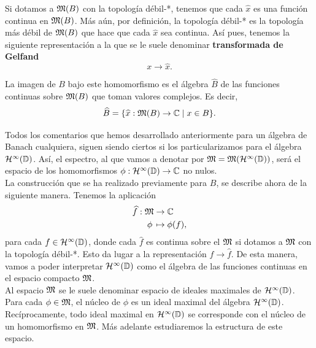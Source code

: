 Si dotamos a $\mathfrak{M}(B)$ con la topología débil-*, tenemos que cada $\widehat x$ es una función continua en $\mathfrak{M}(B)$. Más aún, por definición, la topología débil-* es la topología más débil de $\mathfrak{M}(B)$ que hace que cada $\widehat x$ sea continua. Así pues, tenemos la siguiente representación a la que se le suele denominar \textbf{transformada de Gelfand}
\begin{equation*}
    x \to \widehat x.
\end{equation*}

La imagen de $B$ bajo este homomorfismo es el álgebra $\widehat B$ de las funciones continuas sobre $\mathfrak{M}(B)$ que toman valores complejos. Es decir,
\begin{equation*}
    \widehat B = \{\widehat x: \mathfrak{M}(B) \to  \mathbb{C} \mid x \in B\}.
\end{equation*}

\medskip

Todos los comentarios que hemos desarrollado anteriormente para un álgebra de Banach cualquiera, siguen siendo ciertos si los particularizamos para el álgebra $\mathcal{H}^{\infty}(\mathbb{D})$. Así, el espectro, al que vamos a denotar por $\mathfrak{M} = \mathfrak{M} (\mathcal{H}^{\infty}(\mathbb{D}))$, será el espacio de los homomorfismos $\phi: \mathcal{H}^{\infty}(\mathbb{D}) \to \mathbb{C}$ no nulos. \\

La construcción que se ha realizado previamente para $B$, se describe ahora de la siguiente manera. Tenemos la aplicación
\begin{equation*}
    \begin{split}
        \widehat f:  \mathfrak{M} & \to  \mathbb{C} \\
                    \phi \, & \mapsto  \phi (f),
    \end{split}
\end{equation*}
para cada $f \in \mathcal{H}^{\infty}(\mathbb{D})$, donde cada $\widehat f$ es continua sobre el $\mathfrak{M}$ si dotamos a $\mathfrak{M}$ con la topología débil-*. Esto da lugar a la representación $f \to \widehat f$. De esta manera, vamos a poder interpretar $\mathcal{H}^{\infty}(\mathbb{D})$ como el álgebra de las funciones continuas en el espacio compacto $\mathfrak{M}$. \\

Al espacio $\mathfrak{M}$ se le suele denominar espacio de ideales maximales de $\mathcal{H}^{\infty}(\mathbb{D})$. Para cada $\phi \in \mathfrak{M}$, el núcleo de $\phi$ es un ideal maximal del álgebra $\mathcal{H}^{\infty}(\mathbb{D})$. Recíprocamente, todo ideal maximal en $\mathcal{H}^{\infty}(\mathbb{D})$ se corresponde con el núcleo de un homomorfismo en $\mathfrak{M}$. Más adelante estudiaremos la estructura de este espacio. \\

